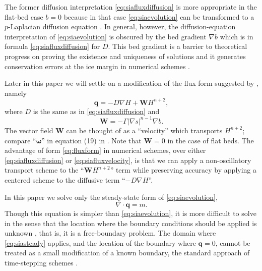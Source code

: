 \documentclass[twocolumn,letterpaper]{igs}
\newcommand\bq{\mathbf{q}}
\newcommand\bW{\mathbf{W}}
\newcommand{\Div}{\nabla\cdot}
\newcommand{\grad}{\nabla}
\begin{document}
The former diffusion interpretation \eqref{eq:siafluxdiffusion} is more appropriate in the flat-bed case $b=0$ because in that case \eqref{eq:siaevolution} can be transformed to a $p$-Laplacian diffusion equation \citep{CDDSV}.  In general, however, the diffusion-equation interpretation of \eqref{eq:siaevolution} is obscured by the bed gradient $\grad b$ which is in formula \eqref{eq:siafluxdiffusion} for $D$.  This bed gradient is a barrier to theoretical progress on proving the existence and uniqueness of solutions \citep{JouvetBueler2012} and it generates conservation errors at the ice margin in numerical schemes \citep{JaroschSchoofAnslow2013}.

Later in this paper we will settle on a modification of the flux form suggested by \cite{JaroschSchoofAnslow2013}, namely
\begin{equation}
\bq = - D \grad H + \bW H^{n+2},\label{eq:fluxform}
\end{equation}
where $D$ is the same as in \eqref{eq:siafluxdiffusion} and
\begin{equation}
\bW = - \Gamma |\grad s|^{n-1} \grad b.  \label{eq:siaWdefine}
\end{equation}
The vector field $\bW$ can be thought of as a ``velocity'' which transports $H^{n+2}$; compare ``$\boldsymbol{\omega}$'' in equation (19) in \citep{JaroschSchoofAnslow2013}.  Note that $\bW=0$ in the case of flat beds.  The advantage of form \eqref{eq:fluxform} in numerical schemes, over either \eqref{eq:siafluxdiffusion} or \eqref{eq:siafluxvelocity}, is that we can apply a non-oscillatory transport scheme to the ``$\bW H^{n+2}$'' term while preserving accuracy by applying a centered scheme to the diffusive term ``$-D \grad H$''.

In this paper we solve only the steady-state form of \eqref{eq:siaevolution},
\begin{equation}
\Div \bq = m.  \label{eq:siasteady}
\end{equation}
Though this equation is simpler than \eqref{eq:siaevolution}, it is more difficult to solve in the sense that the location where the boundary conditions should be applied is unknown \citep{JaroschSchoofAnslow2013,JouvetBueler2012}, that is, it is a free-boundary problem.  The domain where \eqref{eq:siasteady} applies, and the location of the boundary where $\bq=0$, cannot be treated as a small modification of a known boundary, the standard approach of time-stepping schemes \citep{Bueleretal2005,Huybrechtsetal1996}.
\end{document}
